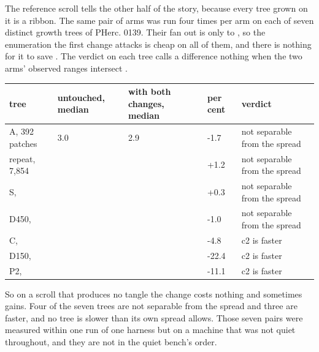The reference scroll tells the other half of the story, because every tree grown on it is a ribbon. The same pair of arms was run four times per arm on each of seven distinct growth trees of PHerc. 0139. Their fan out is only \ZeroOneThreeNineFanOutC{} to \ZeroOneThreeNineFanOutA{} {}, so the enumeration the first change attacks is cheap on all of them, and there is nothing for it to save {}. The verdict on each tree calls a difference nothing when the two arms' observed ranges intersect {}.

\begin{table}[t]
\centering
\small
\begin{tabularx}{\textwidth}{XXXXX}
\toprule
tree & untouched, median & with both changes, median & per cent & verdict \\
\midrule
A, 392 patches & 3.0 & 2.9 & -1.7 & not separable from the spread \\
repeat, 7,854 & \ZeroOneThreeNineMedianPlainRepeat{} & \ZeroOneThreeNineMedianBothRepeat{} & +1.2 & not separable from the spread \\
S, \ZeroOneThreeNinePatchesS{} & \ZeroOneThreeNineMedianPlainS{} & \ZeroOneThreeNineMedianBothS{} & +0.3 & not separable from the spread \\
D450, \ZeroOneThreeNinePatchesDFourFifty{} & \ZeroOneThreeNineMedianPlainDFourFifty{} & \ZeroOneThreeNineMedianBothDFourFifty{} & -1.0 & not separable from the spread \\
C, \ZeroOneThreeNinePatchesC{} & \ZeroOneThreeNineMedianPlainC{} & \ZeroOneThreeNineMedianBothC{} & -4.8 & c2 is faster \\
D150, \ZeroOneThreeNinePatchesDOneFifty{} & \ZeroOneThreeNineMedianPlainDOneFifty{} & \ZeroOneThreeNineMedianBothDOneFifty{} & -22.4 & c2 is faster \\
P2, \ZeroOneThreeNinePatchesPTwo{} & \ZeroOneThreeNineMedianPlainPTwo{} & \ZeroOneThreeNineMedianBothPTwo{} & -11.1 & c2 is faster \\
\bottomrule
\end{tabularx}
\end{table}

So on a scroll that produces no tangle the change costs nothing and sometimes gains. Four of the seven trees are not separable from the spread and three are faster, and no tree is slower than its own spread allows. Those seven pairs were measured within one run of one harness but on a machine that was not quiet throughout, and they are not in the quiet bench's order.

